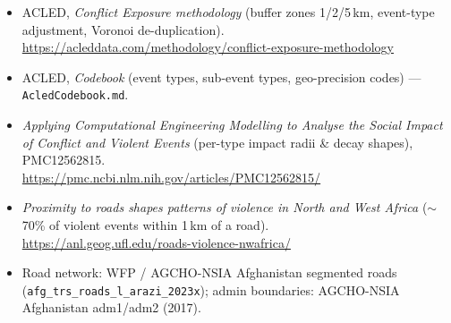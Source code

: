 \documentclass[11pt,a4paper]{article}
\newcommand{\code}[1]{\texttt{\small #1}}
\begin{document}
\begin{itemize}[nosep,leftmargin=1.4em]
  \item ACLED, \emph{Conflict Exposure methodology} (buffer zones 1/2/5\,km, event-type
        adjustment, Voronoi de-duplication).\\
        \url{https://acleddata.com/methodology/conflict-exposure-methodology}
  \item ACLED, \emph{Codebook} (event types, sub-event types, geo-precision codes) ---
        \code{AcledCodebook.md}.
  \item \emph{Applying Computational Engineering Modelling to Analyse the Social Impact of
        Conflict and Violent Events} (per-type impact radii \& decay shapes), PMC12562815.\\
        \url{https://pmc.ncbi.nlm.nih.gov/articles/PMC12562815/}
  \item \emph{Proximity to roads shapes patterns of violence in North and West Africa}
        ($\sim$70\% of violent events within 1\,km of a road).\\
        \url{https://anl.geog.ufl.edu/roads-violence-nwafrica/}
  \item Road network: WFP / AGCHO-NSIA Afghanistan segmented roads
        (\code{afg\_trs\_roads\_l\_arazi\_2023x}); admin boundaries: AGCHO-NSIA Afghanistan
        adm1/adm2 (2017).
\end{itemize}
\end{document}
